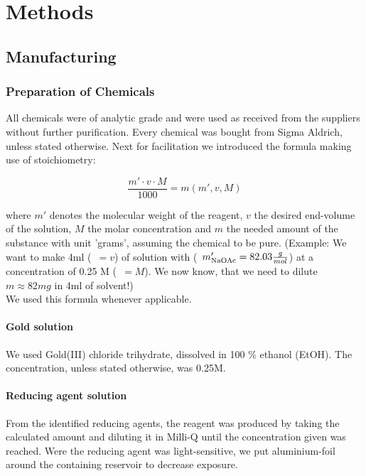 \section{Methods}
\label{sec:Methods}

\subsection{Manufacturing}

\subsubsection{Preparation of Chemicals}

All chemicals were of analytic grade and were used as received from the suppliers without further  purification. Every chemical was bought from Sigma Aldrich, unless stated otherwise. 
Next for facilitation we introduced the formula making use of stoichiometry:

\begin{equation}
\label{eq:RedPrep}
    \frac{m'\cdot v\cdot M}{1000} = m(m',v,M)
\end{equation}


where $m'$ denotes the molecular weight of the reagent, $v$ the desired end-volume of the solution, $M$ the molar concentration and $m$ the needed amount of the substance with unit 'grams', assuming the chemical to be pure. (Example: We want to make 4ml (~$= v$) of solution with  (~$m'_{\ce{NaOAc}}= 82.03 \frac{g}{mol}$) at a concentration of 0.25 M (~$= M$). We now know, that we need to dilute $m \approx 82mg$  in 4ml of solvent!) \\
We used this formula whenever applicable.\\

\paragraph{Gold solution}

We used Gold(III) chloride trihydrate, dissolved in 100 \% ethanol (EtOH). The concentration, unless stated otherwise, was 0.25M.


\paragraph{Reducing agent solution}

From the identified reducing agents, the reagent was produced by taking the calculated amount and diluting it in Milli-Q  until the concentration given was reached. Were the reducing agent was light-sensitive, we put aluminium-foil around the containing reservoir to decrease exposure.


